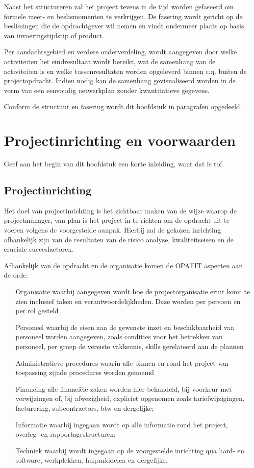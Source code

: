\documentclass{article}
\begin{document}
Naast het structureren zal het project tevens in de tijd worden gefaseerd om formele meet- en beslismomenten te verkrijgen.
De fasering wordt gericht op de beslissingen die de opdrachtgever wil nemen
en vindt ondermeer plaats op basis van invoeringstijdstip of product.

Per aandachtsgebied en verdere onderverdeling, wordt aangegeven door welke activiteiten het eindresultaat wordt bereikt,
wat de samenhang van de activiteiten is en welke tussenresultaten worden opgeleverd binnen c.q. buiten de projectopdracht.
Indien nodig kan de samenhang gevisualiseerd worden in de vorm van een eenvoudig netwerkplan zonder kwantitatieve gegevens.

Conform de structuur en fasering wordt dit hoofdstuk in paragrafen opgedeeld.

\section{Projectinrichting en voorwaarden}

Geef aan het begin van dit hoofdstuk een korte inleiding, want dat is tof.

\subsection{Projectinrichting}

Het doel van projectinrichting is het zichtbaar maken van de wijze waarop de projectmanager,
van plan is het project in te richten om de opdracht uit te voeren volgens de voorgestelde aanpak.
Hierbij zal de gekozen inrichting afhankelijk zijn van de resultaten van de risico analyse,
kwaliteitseisen en de cruciale succesfactoren.

Afhankelijk van de opdracht en de organisatie komen de OPAFIT aspecten aan de orde:
\begin{itemize}
  \item[Organisatie] waarbij aangegeven wordt hoe de projectorganisatie eruit komt te zien inclusief taken en verantwoordelijkheden.
  Deze worden per persoon en per rol gesteld
  \item[Personeel] waarbij de eisen aan de gewenste inzet en beschikbaarheid van personeel worden aangegeven,
  zoals condities voor het betrekken van personeel, per groep de vereiste vakkennis, skills gerelateerd aan de plannen
  \item[Administratieve procedures] waarin alle binnen en rond het project van toepassing zijnde procedures worden genoemd
  \item[Financing] alle financiële zaken worden hier behandeld, bij voorkeur met verwijzingen of, bij afwezigheid,
  expliciet opgenomen zoals tariefwijzigingen, facturering, subcontractors, btw en dergelijke;
  \item[Informatie] waarbij ingegaan wordt op alle informatie rond het project, overleg- en rapportagestructuren;
  \item[Techniek] waarbij wordt ingegaan op de voorgestelde inrichting qua hard- en software, werkplekken, hulpmiddelen en dergelijke.
\end{itemize}
\end{document}

